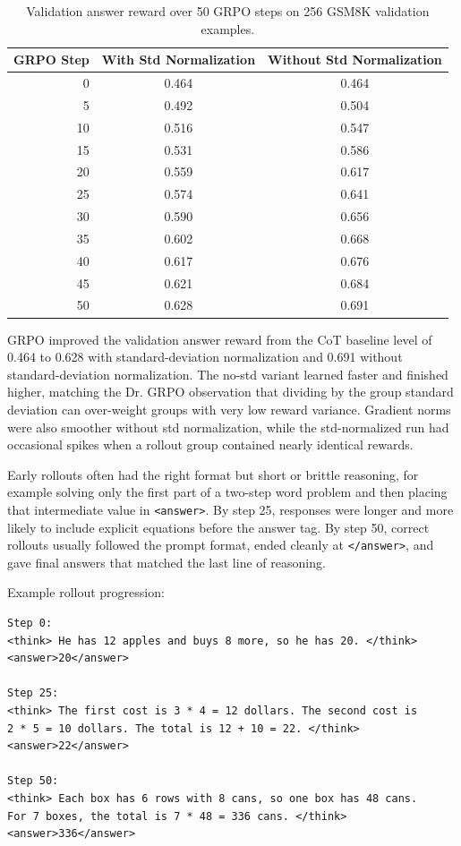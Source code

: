 \documentclass[11pt]{article}
\begin{document}
\begin{table}[h]
\centering
\begin{tabular}{rcc}
\toprule
GRPO Step & With Std Normalization & Without Std Normalization \\
\midrule
0  & 0.464 & 0.464 \\
5  & 0.492 & 0.504 \\
10 & 0.516 & 0.547 \\
15 & 0.531 & 0.586 \\
20 & 0.559 & 0.617 \\
25 & 0.574 & 0.641 \\
30 & 0.590 & 0.656 \\
35 & 0.602 & 0.668 \\
40 & 0.617 & 0.676 \\
45 & 0.621 & 0.684 \\
50 & 0.628 & 0.691 \\
\bottomrule
\end{tabular}
\caption{Validation answer reward over 50 GRPO steps on 256 GSM8K validation examples.}
\end{table}

GRPO improved the validation answer reward from the CoT baseline level of 0.464 to 0.628 with standard-deviation normalization and 0.691 without standard-deviation normalization. The no-std variant learned faster and finished higher, matching the Dr. GRPO observation that dividing by the group standard deviation can over-weight groups with very low reward variance. Gradient norms were also smoother without std normalization, while the std-normalized run had occasional spikes when a rollout group contained nearly identical rewards.

Early rollouts often had the right format but short or brittle reasoning, for example solving only the first part of a two-step word problem and then placing that intermediate value in \texttt{<answer>}. By step 25, responses were longer and more likely to include explicit equations before the answer tag. By step 50, correct rollouts usually followed the prompt format, ended cleanly at \texttt{</answer>}, and gave final answers that matched the last line of reasoning.

Example rollout progression:

\begin{lstlisting}
Step 0:
<think> He has 12 apples and buys 8 more, so he has 20. </think>
<answer>20</answer>

Step 25:
<think> The first cost is 3 * 4 = 12 dollars. The second cost is
2 * 5 = 10 dollars. The total is 12 + 10 = 22. </think>
<answer>22</answer>

Step 50:
<think> Each box has 6 rows with 8 cans, so one box has 48 cans.
For 7 boxes, the total is 7 * 48 = 336 cans. </think>
<answer>336</answer>
\end{lstlisting}
\end{document}
